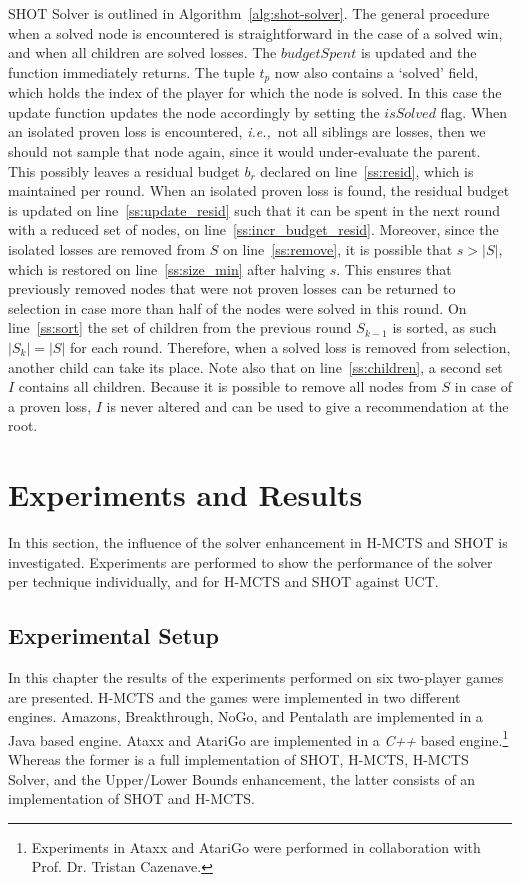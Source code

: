 \documentclass{icga}
\newcommand{\ie}{{\it i.e.,}~}
\newcommand{\func}[1]{{\sc #1}}
\begin{document}
SHOT Solver is outlined in Algorithm~\ref{alg:shot-solver}. The general procedure when a solved node is encountered is straightforward in the case of a solved win, and when all children are solved losses. The $budgetSpent$ is updated and the function immediately returns. The tuple $t_p$ now also contains a `solved' field, which holds the index of the player for which the node is solved. In this case the \func{update} function updates the node accordingly by setting the $isSolved$ flag. When an isolated proven loss is encountered, \ie not all siblings are losses, then we should not sample that node again, since it would under-evaluate the parent. This possibly leaves a residual budget $b_r$ declared on line~\ref{ss:resid}, which is maintained per round. When an isolated proven loss is found, the residual budget is updated on line~\ref{ss:update_resid} such that it can be spent in the next round with a reduced set of nodes, on line~\ref{ss:incr_budget_resid}. Moreover, since the isolated losses are removed from $S$ on line~\ref{ss:remove}, it is possible that $s > |S|$, which is restored on line~\ref{ss:size_min} after halving $s$. This ensures that previously removed nodes that were not proven losses can be returned to selection in case more than half of the nodes were solved in this round. On line~\ref{ss:sort} the set of children from the previous round $S_{k-1}$ is sorted, as such $|S_k| = |S|$ for each round. Therefore, when a solved loss is removed from selection, another child can take its place. Note also that on line~\ref{ss:children}, a second set $I$ contains all children. Because it is possible to remove all nodes from $S$ in case of a proven loss, $I$ is never altered and can be used to give a recommendation at the root.

\section{Experiments and Results}
\label{sec:experiments}
In this section, the influence of the solver enhancement in H-MCTS and SHOT is investigated. Experiments are performed to show the performance of the solver per technique individually, and for H-MCTS and SHOT against UCT.

\subsection{Experimental Setup}
\label{subsec:ex_setup}
In this chapter the results of the experiments performed on six two-player games are presented. H-MCTS and the games were implemented in two different engines. Amazons, Breakthrough, NoGo, and Pentalath are implemented in a Java based engine. Ataxx and AtariGo are implemented in a \emph{C++} based engine.\footnote{Experiments in Ataxx and AtariGo were performed in collaboration with Prof. Dr. Tristan Cazenave.} Whereas the former is a full implementation of SHOT, H-MCTS, H-MCTS Solver, and the Upper/Lower Bounds enhancement, the latter consists of an implementation of SHOT and H-MCTS.
\end{document}
